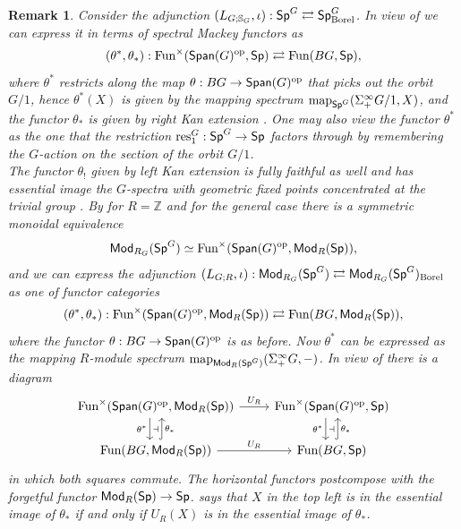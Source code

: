 \documentclass[reqno]{amsart}
\numberwithin{equation}{section}\theoremstyle{thms}
\theoremstyle{defn}
\newtheorem{rem}[equation]{Remark}
\newcommand{\bS}{\mathbb{S}}
\newcommand{\bZ}{\mathbb{Z}}
\newcommand{\tn}[1]{\textnormal{#1}}
\newcommand{\tsf}[1]{\textsf{\textup{#1}}}
\newcommand{\op}{\tn{op}}
\newcommand{\fun}{\tn{Fun}}
\newcommand{\map}{\tn{map}}
\newcommand{\Mod}{\tsf{Mod}}
\newcommand{\Spans}{\tsf{Span}}
\newcommand{\spec}{\tsf{Sp}}
\newcommand{\specg}{\tsf{Sp}^G}
\begin{document}
\begin{rem}
Consider the adjunction $(L_{G;\bS_G},\iota): \specg \rightleftarrows \specg_{\tn{Borel}}$. In view of  we can express it in terms of spectral Mackey functors as
$$(\theta^*,\theta_*): \fun^{\times}(\Spans(G)^{\op},\spec) \rightleftarrows \fun(BG,\spec),$$
where $\theta^*$ restricts along the map $\theta: BG \to \Spans(G)^{\op}$ that picks out the orbit $G/1$, hence $\theta^*(X)$ is given by the mapping spectrum $\map_{\specg}(\Sigma^\infty_+G/1,X)$, and the functor $\theta_*$ is given by right Kan extension \cite[§8]{bgs20}. One may also view the functor $\theta^*$ as the one that the restriction $\tn{res}^G_1: \specg \to \spec$ factors through by remembering the $G$-action on the section of the orbit $G/1$. \\
The functor $\theta_!$ given by left Kan extension is fully faithful as well and has essential image the $G$-spectra with geometric fixed points concentrated at the trivial group \cite[§2]{hau24}. By \cite[§4]{psw22} for $R=\bZ$ and \cite[§14]{bhs23} for the general case there is a symmetric monoidal equivalence 
$$\Mod_{R_G}(\specg) \simeq \fun^{\times}(\Spans(G)^{\op},\Mod_R(\spec)),$$
and we can express the adjunction $(L_{G;R},\iota): \Mod_{R_G}(\specg) \rightleftarrows \Mod_{R_G}(\specg)_{\tn{Borel}}$ as one of functor categories
$$(\theta^*,\theta_*): \fun^{\times}(\Spans(G)^{\op},\Mod_R(\spec)) \rightleftarrows \fun(BG,\Mod_R(\spec)),$$
where the functor $\theta: BG \to \Spans(G)^{\op}$ is as before. Now $\theta^*$ can be expressed as the mapping $R$-module spectrum $\map_{\Mod_R(\specg)}(\Sigma^\infty_+G,-)$. In view of  there is a diagram
\[\begin{tikzcd}
	{\fun^{\times}(\Spans(G)^{\op},\Mod_R(\spec))} & {\fun^{\times}(\Spans(G)^{\op},\spec)} \\
	{\fun(BG,\Mod_R(\spec))} & {\fun(BG,\spec)}
	\arrow["{U_R}", from=1-1, to=1-2]
	\arrow[""{name=0, anchor=center, inner sep=0}, "{\theta^*}"', shift right=2, from=1-1, to=2-1]
	\arrow[""{name=1, anchor=center, inner sep=0}, "{\theta^*}"', shift right=2, from=1-2, to=2-2]
	\arrow[""{name=2, anchor=center, inner sep=0}, "{\theta_*}"', shift right=2, hook, from=2-1, to=1-1]
	\arrow["{U_R}", from=2-1, to=2-2]
	\arrow[""{name=3, anchor=center, inner sep=0}, "{\theta_*}"', shift right=2, hook, from=2-2, to=1-2]
	\arrow["\dashv"{anchor=center}, draw=none, from=0, to=2]
	\arrow["\dashv"{anchor=center}, draw=none, from=1, to=3]
\end{tikzcd}\]
in which both squares commute. The horizontal functors postcompose with the forgetful functor $\Mod_{R}(\spec) \to \spec$.  says that $X$ in the top left is in the essential image of $\theta_*$ if and only if $U_R(X)$ is in the essential image of $\theta_*$.
\end{rem}
\end{document}

